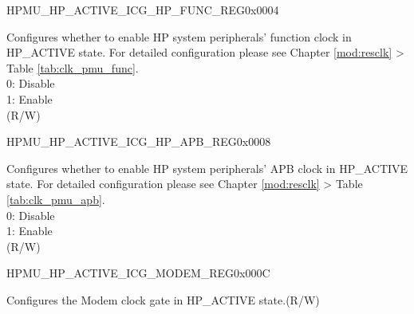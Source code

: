 \begin{register}{H}{PMU\_HP\_ACTIVE\_ICG\_HP\_FUNC\_REG}{0x0004}\label{regdesc:PMUHPACTIVEICGHPFUNCREG}
%
\regnewline%
\begin{regdesc}\begin{reglist}
\label{fielddesc:PMUHPACTIVEDIGICGFUNCEN}\item [PMU\_HP\_ACTIVE\_DIG\_ICG\_FUNC\_EN] Configures whether to enable HP system peripherals' function clock in HP\_ACTIVE state. For detailed configuration please see Chapter \ref{mod:resclk} \textit{} > Table \ref{tab:clk_pmu_func}.\\
0: Disable\\
1: Enable\\
(R/W)
\end{reglist}\end{regdesc}
\end{register}


\begin{register}{H}{PMU\_HP\_ACTIVE\_ICG\_HP\_APB\_REG}{0x0008}\label{regdesc:PMUHPACTIVEICGHPAPBREG}
%
\regnewline%
\begin{regdesc}\begin{reglist}
\label{fielddesc:PMUHPACTIVEDIGICGAPBEN}\item [PMU\_HP\_ACTIVE\_DIG\_ICG\_APB\_EN] Configures whether to enable HP system peripherals' APB clock in HP\_ACTIVE state. For detailed configuration please see Chapter \ref{mod:resclk} \textit{} > Table \ref{tab:clk_pmu_apb}. \\
0: Disable\\
1: Enable\\
(R/W)
\end{reglist}\end{regdesc}
\end{register}


\begin{register}{H}{PMU\_HP\_ACTIVE\_ICG\_MODEM\_REG}{0x000C}\label{regdesc:PMUHPACTIVEICGMODEMREG}
%
%
\regnewline%
\begin{regdesc}\begin{reglist}
\label{fielddesc:PMUHPACTIVEDIGICGMODEMCODE}\item [PMU\_HP\_ACTIVE\_DIG\_ICG\_MODEM\_CODE] Configures the Modem clock gate in HP\_ACTIVE state.(R/W)
\end{reglist}\end{regdesc}
\end{register}

